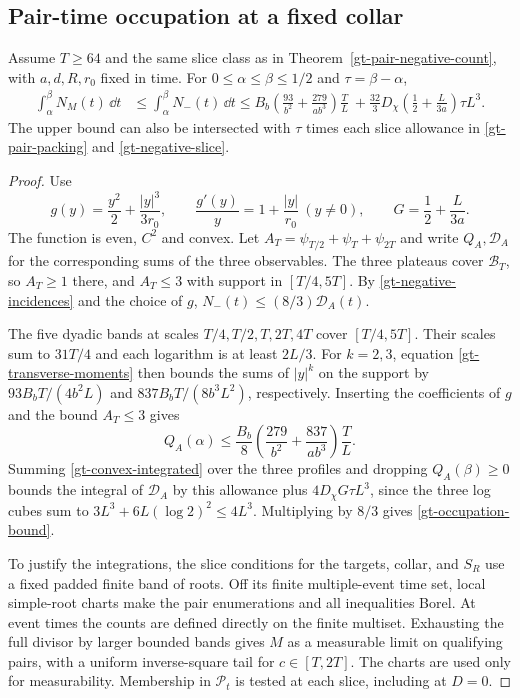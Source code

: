 \subsection{Pair-time occupation at a fixed collar}

\begin{theorem}
\label{gt-pair-occupation}
Assume \(T\ge64\) and the same slice class as in
Theorem~\ref{gt-pair-negative-count}, with \(a,d,R,r_0\)
fixed in time. For \(0\le\alpha\le\beta\le1/2\) and
\(\tau=\beta-\alpha\),
\begin{equation}
 \begin{split}
 \int_\alpha^\beta N_M(t)\,\dd t
 &\le\int_\alpha^\beta N_-(t)\,\dd t\le
 B_b\left(\frac{93}{b^2}+\frac{279}{ab^3}\right)\frac{T}{L}\
 +\frac{32}{3}D_\chi
    \left(\frac12+\frac{L}{3a}\right)\tau L^3 .
 \end{split}
 \label{gt-occupation-bound}
\end{equation}
The upper bound can also be intersected with \(\tau\) times each
slice allowance in \eqref{gt-pair-packing} and
\eqref{gt-negative-slice}.
\end{theorem}

\begin{proof}
Use
\[
 g(y)=\frac{y^2}{2}+\frac{|y|^3}{3r_0},
 \qquad \frac{g'(y)}{y}=1+\frac{|y|}{r_0}\ (y\ne0),\qquad
 G=\frac12+\frac{L}{3a}.
\]
The function is even, \(C^2\) and convex. Let
\(A_T=\psi_{T/2}+\psi_T+\psi_{2T}\) and write \(Q_A,\mathcal D_A\)
for the corresponding sums of the three observables. The three
plateaus cover \(\mathcal B_T\), so \(A_T\ge1\) there, and \(A_T\le3\)
with support in \([T/4,5T]\). By \eqref{gt-negative-incidences}
and the choice of \(g\), \(N_-(t)\le(8/3)\mathcal D_A(t)\).

The five dyadic bands at scales \(T/4,T/2,T,2T,4T\) cover
\([T/4,5T]\). Their scales sum to \(31T/4\) and each logarithm is
at least \(2L/3\). For \(k=2,3\), equation
\eqref{gt-transverse-moments} then bounds the sums of \(|y|^k\)
on the support by \(93B_bT/(4b^2 L)\) and
\(837B_bT/(8b^3L^2)\), respectively. Inserting the coefficients of
\(g\) and the bound \(A_T\le3\) gives
\[
 Q_A(\alpha)\le\frac{B_b}{8}
     \left(\frac{279}{b^2}+\frac{837}{ab^3}\right)\frac{T}{L}.
\]
Summing \eqref{gt-convex-integrated} over the three profiles and
dropping \(Q_A(\beta)\ge0\) bounds the integral of
\(\mathcal D_A\) by this allowance plus \(4D_\chi G\tau L^3\),
since the three log cubes sum to \(3L^3+6L(\log2)^2\le4L^3\).
Multiplying by \(8/3\) gives \eqref{gt-occupation-bound}.

To justify the integrations, the slice conditions for the targets,
collar, and \(S_R\) use a fixed padded finite band of roots.
Off its finite multiple-event time set, local simple-root charts
make the pair enumerations and all inequalities Borel. At event
times the counts are defined directly on the finite multiset.
Exhausting the full divisor by larger bounded bands gives \(M\)
as a measurable limit on qualifying pairs, with a uniform
inverse-square tail for \(c\in[T,2T]\). The charts are used only
for measurability. Membership in \(\mathcal P_t\) is tested at
each slice, including at \(D=0\).
\end{proof}

